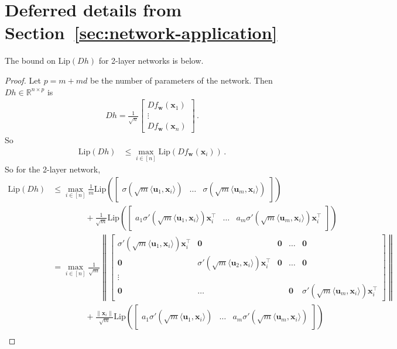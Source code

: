 \documentclass[11pt]{article} %
\newcommand{\R}{\mathbb{R}}
\newcommand{\<}{\langle}
\renewcommand{\>}{\rangle}
\def\bzero{{\boldsymbol 0}}
\def\bu{{\boldsymbol u}}
\def\bw{{\boldsymbol w}}
\def\bx{{\boldsymbol x}}
\newcommand{\Lip}{\mathrm{Lip}}
\theoremstyle{plain}
\theoremstyle{definition}
\theoremstyle{remark}
\begin{document}
\section{Deferred details from Section~\ref{sec:network-application}}\label{app:deferred-network-application}

The bound on $\Lip(Dh)$ for 2-layer networks is below.
\lipdhtwolayer*
\begin{proof}
Let $p = m + md$ be the number of parameters of the network. Then $Dh \in \R^{n \times p}$ is
\begin{align*}
Dh = \frac{1}{\sqrt{n}} \begin{bmatrix}Df_{\bw}(\bx_1) \\ \vdots \\ Df_{\bw}(\bx_n)\end{bmatrix}\,.
\end{align*}
So 
\begin{align*}
\Lip(Dh) &\leq \max_{i \in [n]} \Lip(Df_{\bw}(\bx_i))\,.
\end{align*}
So for the 2-layer network,
\begin{align*}
\Lip(Dh) &\leq \max_{i \in [n]} \frac{1}{m}\Lip(\begin{bmatrix} \sigma(\sqrt{m}\<\bu_1,\bx_i\>) &  \ldots & \sigma(\sqrt{m}\<\bu_m,\bx_i\>)\end{bmatrix}) \\
&\quad\quad\quad\quad + \frac{1}{\sqrt{m}} \Lip(\begin{bmatrix} a_1\sigma'(\sqrt{m}\<\bu_1,\bx_i\>)\bx_i^{\top} &  \ldots & a_m\sigma'(\sqrt{m}\<\bu_m,\bx_i\>)\bx_i^{\top} \end{bmatrix}) \\
&= \max_{i \in [n]} \frac{1}{\sqrt{m}} \left\|\begin{bmatrix} \sigma'(\sqrt{m}\<\bu_1,\bx_i\>) \bx_i^{\top} & \bzero & \bzero & \ldots & \bzero \\
\bzero & \sigma'(\sqrt{m}\<\bu_2,\bx_i\>) \bx_i^{\top} & \bzero & \ldots & \bzero \\
\vdots & & & & \\
\bzero & \ldots & & \bzero & \sigma'(\sqrt{m}\<\bu_m,\bx_i\>)\bx_i^{\top}\end{bmatrix}\right\| \\
&\quad\quad\quad\quad + \frac{\|\bx_i\|}{\sqrt{m}} \Lip(\begin{bmatrix} a_1\sigma'(\sqrt{m}\<\bu_1,\bx_i\>) &  \ldots & a_m\sigma'(\sqrt{m}\<\bu_m,\bx_i\>) \end{bmatrix}) \\

\end{align*}
\end{proof}
\end{document}

